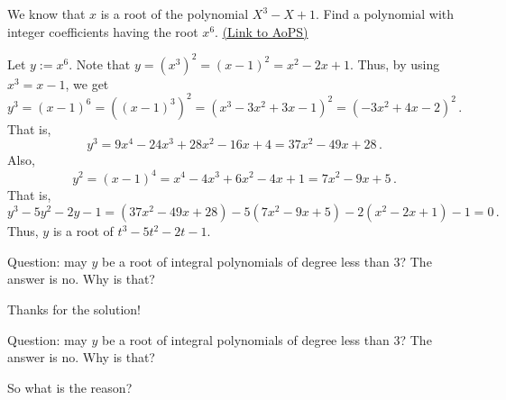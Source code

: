 \begin{problem}
	We know that $x$ is a root of the polynomial $X^3-X+1$.
Find a polynomial with integer coefficients having the root $x^6$.
	\flushright \href{https://artofproblemsolving.com/community/c6h404447}{(Link to AoPS)}
\end{problem}



\begin{solution}
	Let $y:=x^6$.  Note that $y=\left(x^3\right)^2=(x-1)^2=x^2-2x+1$.  Thus, by using $x^3=x-1$, we get \[y^3=(x-1)^6=\left((x-1)^3\right)^2=\left(x^3-3x^2+3x-1\right)^2=\left(-3x^2+4x-2\right)^2\,.\]  That is, \[y^3=9x^4-24x^3+28x^2-16x+4=37x^2-49x+28\,.\]  Also, \[y^2=(x-1)^4=x^4-4x^3+6x^2-4x+1=7x^2-9x+5\,.\]  That is, \[y^3-5y^2-2y-1=\left(37x^2-49x+28\right)-5\left(7x^2-9x+5\right)-2\left(x^2-2x+1\right)-1=0\,.\]  Thus, $y$ is a root of $t^3-5t^2-2t-1$.

Question: may $y$ be a root of integral polynomials of degree less than $3$?  The answer is no.  Why is that?
\end{solution}






\begin{solution}
	Thanks for the solution!
\begin{tcolorbox}
Question: may $y$ be a root of integral polynomials of degree less than $3$?  The answer is no.  Why is that?\end{tcolorbox}
So what is the reason?
\end{solution}



